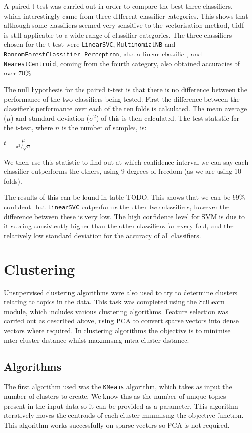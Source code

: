 \documentclass{article}
\begin{document}
A paired t-test was carried out in order to compare the best three classifiers, which interestingly came from three different classifier categories. This shows that although some classifiers seemed very sensitive to the vectorisation method, tfidf is still applicable to a wide range of classifier categories. The three classifiers chosen for the t-test were \verb|LinearSVC|, \verb|MultinomialNB| and \verb|RandomForestClassifier|. \verb|Perceptron|, also a linear classifier, and \verb|NearestCentroid|, coming from the fourth category, also obtained accuracies of over 70\%.

The null hypothesis for the paired t-test is that there is no difference between the performance of the two classifiers being tested. First the difference between the classifier's performance over each of the ten folds is calculated. The mean average ($\mu$) and standard deviation ($\sigma^2$) of this is then calculated. The test statistic for the t-test, where $n$ is the number of samples, is:
\begin{center}
$t = \frac{\mu}{\sigma^2 / \sqrt{n}}$
\end{center}
We then use this statistic to find out at which confidence interval we can say each classifier outperforms the others, using 9 degrees of freedom (as we are using 10 folds).

The results of this can be found in table TODO. This shows that we can be 99\% confident that \verb|LinearSVC| outperforms the other two classifiers, however the difference between these is very low. The high confidence level for SVM is due to it scoring consistently higher than the other classifiers for every fold, and the relatively low standard deviation for the accuracy of all classifiers.

\section{Clustering}
Unsupervised clustering algorithms were also used to try to determine clusters relating to topics in the data. This task was completed using the SciLearn module, which includes various clustering algorithms. Feature selection was carried out as described above, using PCA to convert sparse vectors into dense vectors where required. In clustering algorithms the objective is to minimise inter-cluster distance whilst maximising intra-cluster distance.

\subsection{Algorithms}
The first algorithm used was the \verb|KMeans| algorithm, which takes as input the number of clusters to create. We know this as the number of unique topics present in the input data so it can be provided as a parameter. This algorithm iteratively moves the centroids of each cluster minimising the objective function. This algorithm works successfully on sparse vectors so PCA is not required.
\end{document}
